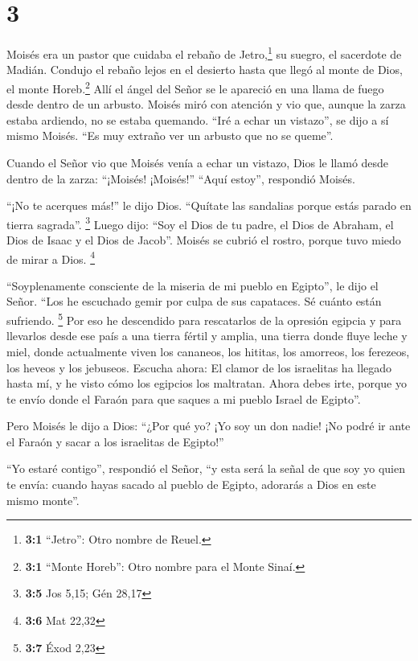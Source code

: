 \hypertarget{section-2}{%
\section{3}\label{section-2}}

 Moisés era un pastor que cuidaba el rebaño de
Jetro,\footnote{\textbf{3:1} ``Jetro'': Otro nombre de Reuel.} su
suegro, el sacerdote de Madián. Condujo el rebaño lejos en el desierto
hasta que llegó al monte de Dios, el monte Horeb.\footnote{\textbf{3:1}
  ``Monte Horeb'': Otro nombre para el Monte Sinaí.}  Allí
el ángel del Señor se le apareció en una llama de fuego desde dentro de
un arbusto. Moisés miró con atención y vio que, aunque la zarza estaba
ardiendo, no se estaba quemando.  ``Iré a echar un
vistazo'', se dijo a sí mismo Moisés. ``Es muy extraño ver un arbusto
que no se queme''.

 Cuando el Señor vio que Moisés venía a echar un vistazo,
Dios le llamó desde dentro de la zarza: ``¡Moisés! ¡Moisés!'' ``Aquí
estoy'', respondió Moisés.

 ``¡No te acerques más!'' le dijo Dios. ``Quítate las
sandalias porque estás parado en tierra sagrada''. \footnote{\textbf{3:5}
  Jos 5,15; Gén 28,17}  Luego dijo: ``Soy el Dios de tu
padre, el Dios de Abraham, el Dios de Isaac y el Dios de Jacob''. Moisés
se cubrió el rostro, porque tuvo miedo de mirar a Dios. \footnote{\textbf{3:6}
  Mat 22,32}

 ``Soyplenamente consciente de la miseria de mi pueblo en
Egipto'', le dijo el Señor. ``Los he escuchado gemir por culpa de sus
capataces. Sé cuánto están sufriendo. \footnote{\textbf{3:7} Éxod 2,23}
 Por eso he descendido para rescatarlos de la opresión
egipcia y para llevarlos desde ese país a una tierra fértil y amplia,
una tierra donde fluye leche y miel, donde actualmente viven los
cananeos, los hititas, los amorreos, los ferezeos, los heveos y los
jebuseos.  Escucha ahora: El clamor de los israelitas ha
llegado hasta mí, y he visto cómo los egipcios los maltratan.
 Ahora debes irte, porque yo te envío donde el Faraón
para que saques a mi pueblo Israel de Egipto''.

 Pero Moisés le dijo a Dios: ``¿Por qué yo? ¡Yo soy un
don nadie! ¡No podré ir ante el Faraón y sacar a los israelitas de
Egipto!''

 ``Yo estaré contigo'', respondió el Señor, ``y esta será
la señal de que soy yo quien te envía: cuando hayas sacado al pueblo de
Egipto, adorarás a Dios en este mismo monte''.

